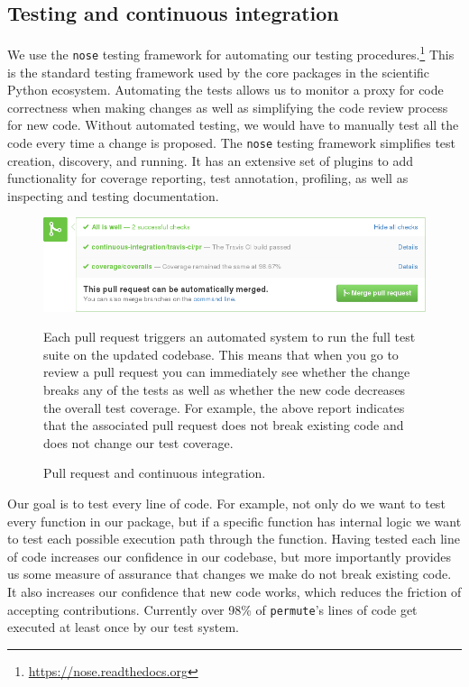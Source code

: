 \documentclass[]{article}
\begin{document}
\subsection{\label{sec:test}Testing and continuous integration}

We use the \texttt{nose} testing framework for automating our testing
procedures.\footnote{\url{https://nose.readthedocs.org}}
This is the standard testing framework used by the core packages in the
scientific Python ecosystem.
Automating the tests allows us to monitor a proxy for code correctness when
making changes as well as simplifying the code review process for new code.
Without automated testing, we would have to manually test all the code every
time a change is proposed.
The \texttt{nose} testing framework simplifies test creation, discovery, and
running.
It has an extensive set of plugins to add functionality for coverage reporting,
test annotation, profiling, as well as inspecting and testing documentation.

\begin{figure}
  \begin{centering}
    \includegraphics[width=\textwidth]{pull-request-ci.png}\par
  \end{centering}

  \caption{\label{fig:pull-request}Pull request and continuous integration.}
\setlength{\leftskip}{1cm}
\setlength{\rightskip}{1cm}
\small
Each pull request triggers an automated system to run the  full test suite on
the updated codebase.
This means that when you go to review a pull request you can immediately see
whether the change breaks any of the tests as well as whether the new
code decreases the overall test coverage.
For example, the above report indicates that the associated pull request does not
break existing code and does not change our test coverage.
\end{figure}

Our goal is to test every line of code.
For example, not only do we want to test every function in our package, but if
a specific function has internal logic we want to test each possible execution
path through the function.
Having tested each line of code increases our confidence in our codebase, but
more importantly provides us some measure of assurance that changes we make do
not break existing code.
It also increases our confidence that new code works, which reduces the
friction of accepting contributions.
Currently over 98\% of \texttt{permute}'s lines of code get executed at least
once by our test system.
\end{document}

